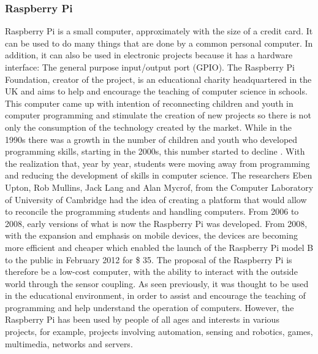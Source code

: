 \documentclass{acm_proc_article-sp}
\begin{document}
\subsubsection{Raspberry Pi}
Raspberry Pi is a small computer, approximately with the size of a credit card. It can be used to do many things that are done by a common personal computer\cite{raspberryfoundation}. In addition, it can also be used in electronic projects because it has a hardware interface: The general purpose input/output port (GPIO). The Raspberry Pi Foundation, creator of the project, is an educational charity headquartered in the UK and aims to help and encourage the teaching of computer science in schools.
\newline
\newline
This computer came up with intention of reconnecting children and youth in computer programming and stimulate the creation of new projects so there is not only the consumption of the technology created by the market. While in the 1990s there was a growth in the number of children and youth who developed programming skills, starting in the 2000s, this number started to decline \cite{raspberryAbout}.
\newline
\newline
With the realization that, year by year, students were moving away from programming and reducing the development of skills in computer science. The researchers Eben Upton, Rob Mullins, Jack Lang and Alan Mycrof, from the Computer Laboratory of University of Cambridge had the idea of creating a platform that would allow to reconcile the programming students  and handling computers\cite{dennis2013raspberry}. From 2006 to 2008, early versions of what is now the Raspberry Pi was developed. From 2008, with the expansion and emphasis on mobile devices, the devices are becoming more efficient and cheaper which enabled the launch of the Raspberry Pi model B to the public in February 2012 for \$ 35.
\newline
\newline
The proposal of the Raspberry Pi is therefore be a low-cost computer, with the ability to interact with the outside world through the sensor coupling. As seen previously, it was thought to be used in the educational environment, in order to assist and encourage the teaching of programming and help understand the operation of computers. However, the Raspberry Pi has been used by people of all ages and interests in various projects, for example, projects involving automation, sensing and robotics, games, multimedia, networks and servers.
\end{document}
